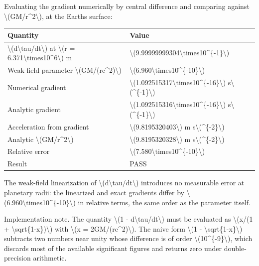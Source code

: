\documentclass[
  10pt,
]{article}
\begin{document}
Evaluating the gradient numerically by central difference and comparing
against \textbackslash(GM/r\^{}2\textbackslash), at the
Earth\textquotesingle s surface:

\begin{longtable}[]{@{}ll@{}}
\toprule\noalign{}
Quantity & Value \\
\midrule\noalign{}
\endhead
\bottomrule\noalign{}
\endlastfoot
\textbackslash(d\textbackslash tau/dt\textbackslash) at \textbackslash(r
= 6.371\textbackslash times10\^{}6\textbackslash) m &
\textbackslash(9.99999999304\textbackslash times10\^{}\{-1\}\textbackslash) \\
Weak-field parameter \textbackslash(GM/(rc\^{}2)\textbackslash) &
\textbackslash(6.960\textbackslash times10\^{}\{-10\}\textbackslash) \\
Numerical gradient &
\textbackslash(1.092515317\textbackslash times10\^{}\{-16\}\textbackslash)
s\textbackslash(\^{}\{-1\}\textbackslash) \\
Analytic gradient &
\textbackslash(1.092515316\textbackslash times10\^{}\{-16\}\textbackslash)
s\textbackslash(\^{}\{-1\}\textbackslash) \\
Acceleration from gradient & \textbackslash(9.8195320403\textbackslash)
m s\textbackslash(\^{}\{-2\}\textbackslash) \\
Analytic \textbackslash(GM/r\^{}2\textbackslash) &
\textbackslash(9.8195320328\textbackslash) m
s\textbackslash(\^{}\{-2\}\textbackslash) \\
Relative error &
\textbackslash(7.580\textbackslash times10\^{}\{-10\}\textbackslash) \\
Result & PASS \\
\end{longtable}

The weak-field linearization of
\textbackslash(d\textbackslash tau/dt\textbackslash) introduces no
measurable error at planetary radii: the linearized and exact gradients
differ by
\textbackslash(6.960\textbackslash times10\^{}\{-10\}\textbackslash) in
relative terms, the same order as the parameter itself.

Implementation note. The quantity \textbackslash(1 -
d\textbackslash tau/dt\textbackslash) must be evaluated as
\textbackslash(x/(1 + \textbackslash sqrt\{1-x\})\textbackslash) with
\textbackslash(x = 2GM/(rc\^{}2)\textbackslash). The naive form
\textbackslash(1 - \textbackslash sqrt\{1-x\}\textbackslash) subtracts
two numbers near unity whose difference is of order
\textbackslash(10\^{}\{-9\}\textbackslash), which discards most of the
available significant figures and returns zero under double-precision
arithmetic.
\end{document}
